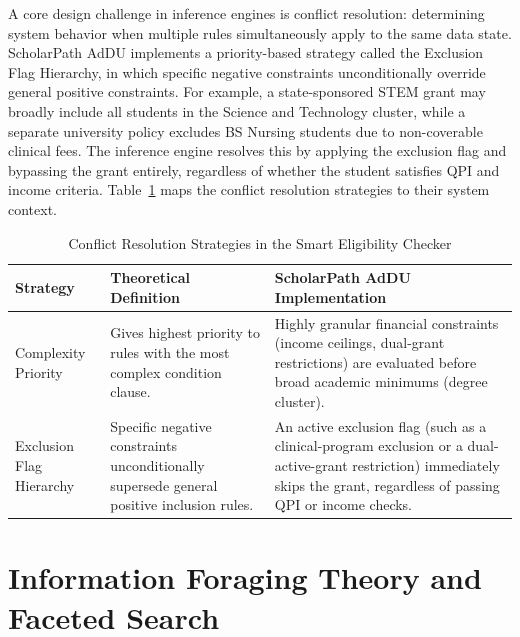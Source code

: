 A core design challenge in inference engines is conflict resolution: determining system behavior when multiple rules simultaneously apply to the same data state. ScholarPath AdDU implements a priority-based strategy called the Exclusion Flag Hierarchy, in which specific negative constraints unconditionally override general positive constraints. For example, a state-sponsored STEM grant may broadly include all students in the Science and Technology cluster, while a separate university policy excludes BS Nursing students due to non-coverable clinical fees. The inference engine resolves this by applying the exclusion flag and bypassing the grant entirely, regardless of whether the student satisfies QPI and income criteria. Table~\ref{tab:conflict} maps the conflict resolution strategies to their system context. \begin{table}[htbp]
  \centering
  \small
  \begin{tabular}{@{}p{3.4cm} p{5.2cm} p{5.2cm}@{}}
    \toprule
    Strategy & Theoretical Definition & ScholarPath AdDU Implementation \\
    \midrule
    Complexity Priority & Gives highest priority to rules with the most complex condition clause. & Highly granular financial constraints (income ceilings, dual-grant restrictions) are evaluated before broad academic minimums (degree cluster). \\
    \addlinespace
    Exclusion Flag Hierarchy & Specific negative constraints unconditionally supersede general positive inclusion rules. & An active exclusion flag (such as a clinical-program exclusion or a dual-active-grant restriction) immediately skips the grant, regardless of passing QPI or income checks. \\
    \bottomrule
  \end{tabular}
  \caption{Conflict Resolution Strategies in the Smart Eligibility Checker}
  \label{tab:conflict}
\end{table}


\section{Information Foraging Theory and Faceted Search}

